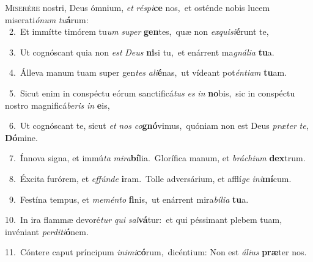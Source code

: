 \lettrine{\initial\textcolor{\initialcolor}{M}}{iserére} nostri, Deus ómnium, \textit{et} \textit{ré}\-\textit{spi}\textbf{ce} nos,~\star et osténde nobis lucem miserati\-\textit{ó}\-\textit{num} \textit{tu}\-\textbf{á}rum:\\
{\numbfont\textcolor{\numbcolor}{~2.}}~Et immítte timórem tu\textit{um} \textit{su}\-\textit{per} \textbf{gen}\-tes,~\star quæ non \textit{ex}\-\textit{qui}\textit{si}\textbf{é}runt te,\par
{\numbfont\textcolor{\numbcolor}{~3.}}~Ut cognóscant quia non \textit{est} \textit{De}\-\textit{us} \textbf{ni}\-si tu,~\star et enárrent ma\-\textit{gná}\-\textit{li}\textit{a} \textbf{tu}\-a.\par
{\numbfont\textcolor{\numbcolor}{~4.}}~Álleva manum tuam super gen\textit{tes} \textit{a}\-\textit{li}\textbf{é}nas,~\star ut vídeant pot\-\textit{én}\-\textit{ti}\textit{am} \textbf{tu}\-am.\par
{\numbfont\textcolor{\numbcolor}{~5.}}~Sicut enim in conspéctu eórum sanctificá\textit{tus} \textit{es} \textit{in} \textbf{no}\-bis,~\star sic in conspéctu nostro magnificá\-\textit{be}\-\textit{ris} \textit{in} \textbf{e}\-is,\par
{\numbfont\textcolor{\numbcolor}{~6.}}~Ut cognóscant te, sicut \textit{et} \textit{nos} \textit{co}\-\textbf{gnó}vimus,~\star quóniam non est Deus \textit{præ}\-\textit{ter} \textit{te}\-, \textbf{Dó}\-mine.\par
{\numbfont\textcolor{\numbcolor}{~7.}}~Ínnova signa, et immú\textit{ta} \textit{mi}\-\textit{ra}\textbf{bí}lia.~\star Glorífica manum, et \textit{brá}\-\textit{chi}\textit{um} \textbf{dex}\-trum.\par
{\numbfont\textcolor{\numbcolor}{~8.}}~Éxcita furórem, et \textit{ef}\-\textit{fún}\textit{de} \textbf{i}\-ram.~\star Tolle adversárium, et afflí\textit{ge} \textit{in}\-\textit{i}\textbf{mí}cum.\par
{\numbfont\textcolor{\numbcolor}{~9.}}~Festína tempus, et \textit{me}\-\textit{mén}\textit{to} \textbf{fi}\-nis,~\star ut enárrent mira\-\textit{bí}\-\textit{li}\textit{a} \textbf{tu}\-a.\par
{\numbfont\textcolor{\numbcolor}{10.}}~In ira flammæ devoré\textit{tur} \textit{qui} \textit{sal}\-\textbf{vá}tur:~\star et qui péssimant plebem tuam, invéniant \textit{per}\-\textit{di}\textit{ti}\textbf{ó}nem.\par
{\numbfont\textcolor{\numbcolor}{11.}}~Cóntere caput príncipum \textit{in}\-\textit{i}\textit{mi}\textbf{có}rum,~\star dicéntium: Non est \textit{á}\-\textit{li}\textit{us} \textbf{præ}\-ter nos.\par
